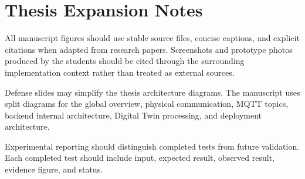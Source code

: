 \chapter{Thesis Expansion Notes}

All manuscript figures should use stable source files, concise captions, and explicit citations when adapted from research papers. Screenshots and prototype photos produced by the students should be cited through the surrounding implementation context rather than treated as external sources.

Defense slides may simplify the thesis architecture diagrams. The manuscript uses split diagrams for the global overview, physical communication, MQTT topics, backend internal architecture, Digital Twin processing, and deployment architecture.

Experimental reporting should distinguish completed tests from future validation. Each completed test should include input, expected result, observed result, evidence figure, and status.
